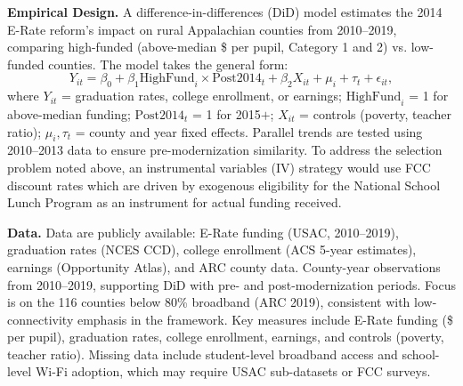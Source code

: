 \textbf{Empirical Design.} A difference-in-differences (DiD) model estimates the 2014 E-Rate reform’s impact on rural Appalachian counties from 2010–2019, comparing high-funded (above-median \$ per pupil, Category 1 and 2) vs. low-funded counties. The model takes the general form:
\[
Y_{it} = \beta_0 + \beta_1 \text{HighFund}_i \times \text{Post2014}_t + \beta_2 X_{it} + \mu_i + \tau_t + \epsilon_{it},
\]
where $Y_{it}$ = graduation rates, college enrollment, or earnings; $\text{HighFund}_i$ = 1 for above-median funding; $\text{Post2014}_t$ = 1 for 2015$+$; $X_{it}$ = controls (poverty, teacher ratio); $\mu_i, \tau_t$ = county and year fixed effects. Parallel trends are tested using 2010–2013 data to ensure pre-modernization similarity. To address the selection problem noted above, an instrumental variables (IV) strategy would use FCC discount rates which are driven by exogenous eligibility for the National School Lunch Program as an instrument for actual funding received. 

\textbf{Data.} Data are publicly available: E-Rate funding (USAC, 2010–2019), graduation rates (NCES CCD), college enrollment (ACS 5-year estimates), earnings (Opportunity Atlas), and ARC county data. County-year observations from 2010–2019, supporting DiD with pre- and post-modernization periods. Focus is on the 116 counties below 80\% broadband (ARC 2019), consistent with low-connectivity emphasis in the framework. Key measures include E-Rate funding (\$ per pupil), graduation rates, college enrollment, earnings, and controls (poverty, teacher ratio). Missing data include student-level broadband access and school-level Wi-Fi adoption, which may require USAC sub-datasets or FCC surveys.




